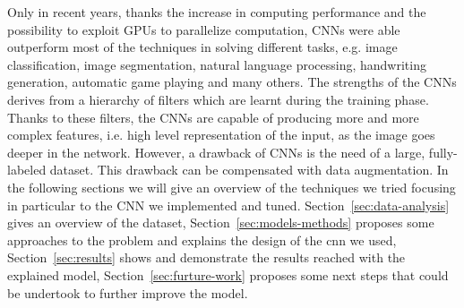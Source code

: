 \documentclass[10pt,conference,compsocconf]{IEEEtran}
\begin{document}
Only in recent years, thanks the increase in computing performance and the possibility to exploit GPUs to parallelize computation, CNNs were able outperform most of the techniques in solving different tasks, e.g. image classification, image segmentation, natural language processing, handwriting generation, automatic game playing and many others. The strengths of the CNNs derives from a hierarchy of filters which are learnt during the training phase. Thanks to these filters, the CNNs are capable of producing more and more complex features, i.e. high level representation of the input, as the image goes deeper in the network. However, a drawback of CNNs is the need of a large, fully-labeled dataset. This drawback can be compensated with data augmentation. 
In the following sections we will give an overview of the techniques we tried focusing in particular to the CNN we implemented and tuned. Section~\ref{sec:data-analysis} gives an overview of the dataset, Section~\ref{sec:models-methods} proposes some approaches to the problem and explains the design of the cnn we used, Section~\ref{sec:results} shows and demonstrate the results reached with the explained model, Section~\ref{sec:furture-work} proposes some next steps that could be undertook to further improve the model.
\end{document}
